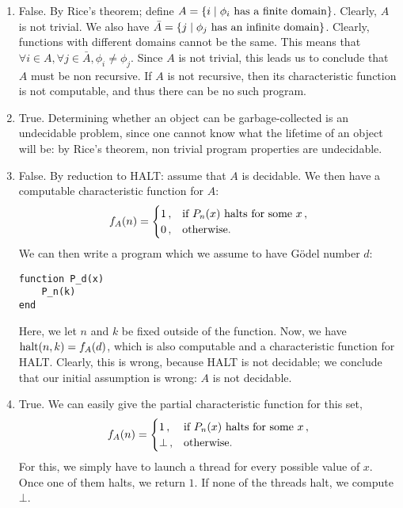 \begin{solution}
\begin{enumerate}
\item False.
By Rice's theorem; define
\(A = \{i \mid \phi_i \textnormal{ has a finite domain}\}\).
Clearly, \(A\) is not trivial.
We also have
\(\bar{A} = \{j \mid
\phi_j \textnormal{ has an infinite domain}\}\).
Clearly, functions with different domains cannot be the same.
This means that
\(\forall i \in A, \forall j \in \bar{A}, \phi_i \ne \phi_j\).
Since \(A\) is not trivial, this leads us to conclude
that \(A\) must be non recursive.
If \(A\) is not recursive, then its characteristic function
is not computable, and thus there can be no such program.
\item True.
Determining whether an object can be garbage-collected
is an undecidable problem,
since one cannot know what the lifetime of an object will be:
by Rice's theorem, non trivial program properties
are undecidable.
\item False.
By reduction to HALT:
assume that \(A\) is decidable.
We then have a computable characteristic function for \(A\):
\[
f_A(n) =
\begin{cases}
1\,, & \textnormal{if } P_n(x) \textnormal{ halts for some }x\,,\\
0\,, & \textnormal{otherwise.}
\end{cases}
\]
We can then write a program which we assume to have Gödel number \(d\):
\begin{verbatim}
function P_d(x)
	P_n(k)
end
\end{verbatim}
Here, we let \(n\) and \(k\) be fixed outside of the function.
Now, we have \(\mathrm{halt}(n, k) = f_A(d)\),
which is also computable and a characteristic function for HALT.
Clearly, this is wrong, because HALT is not decidable;
we conclude that our initial assumption is wrong: \(A\) is not decidable.
\item True.
We can easily give the partial characteristic function for this set,
\[
f_{A}(n) =
\begin{cases}
1\,, & \textnormal{if } P_n(x) \textnormal{ halts for some } x\,,\\
\bot\,, & \textnormal{otherwise.}
\end{cases}
\]
For this, we simply have to launch a thread for every possible value of \(x\).
Once one of them halts, we return \(1\).
If none of the threads halt, we compute \(\bot\).
\end{enumerate}
\end{solution}

